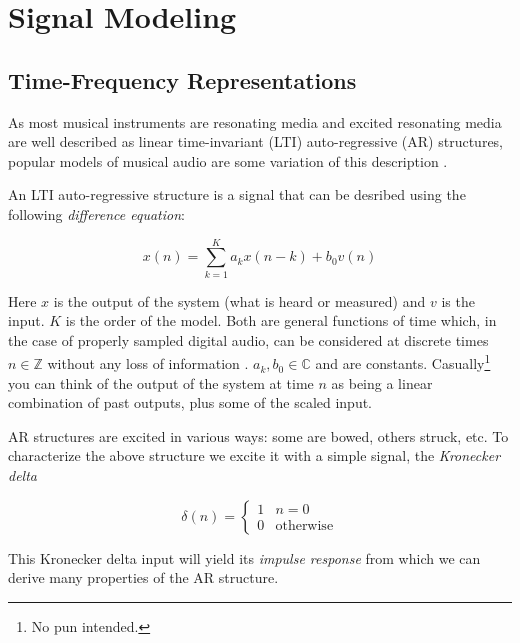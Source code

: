 \chapter{Signal Modeling}

\section{Time-Frequency Representations \label{sec:timefreqrep}}

As most musical instruments are resonating media and excited resonating media
are well described as linear time-invariant (LTI) auto-regressive (AR)
structures, popular models of musical audio are some variation of this
description \cite{fletcher2012physics}.

An LTI auto-regressive structure is a signal that can be desribed using the
following \textit{difference equation}:

\begin{equation}
    x(n) = \sum_{k=1}^{K} a_k x(n-k) + b_0 v(n)
\end{equation}

Here $x$ is the output of the system (what is heard or measured) and $v$ is the
input. $K$ is the order of the model. Both are general functions of time which,
in the case of properly sampled digital audio, can be considered at discrete
times $n \in \mathbb{Z}$ without any loss of information
\cite[ch.~2]{crochiere1983multi}.  $a_k,b_0 \in \mathbb{C}$ and are constants.
Casually\footnote{No pun intended.} you can think of the output of the system at
time $n$ as being a linear combination of past outputs, plus some of the scaled
input.

AR structures are excited in various ways: some are bowed, others struck, etc.
To characterize the above structure we excite it with a simple signal, the
\textit{Kronecker delta}

\begin{equation}
    \delta(n) = \begin{cases}
        1 & n=0\\
        0 & \text{otherwise}
    \end{cases}
\end{equation}

This Kronecker delta input will yield its \textit{impulse
response} from which we can derive many properties of the AR structure.

